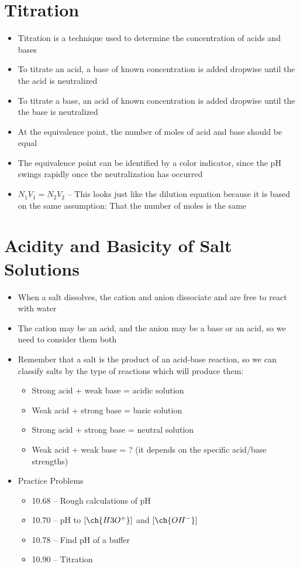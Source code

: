 \documentclass[12pt, openany, letterpaper]{memoir}
\begin{document}
\section{Titration}
\begin{itemize}
	\item Titration is a technique used to determine the concentration of acids and bases
	\item To titrate an acid, a base of known concentration is added dropwise until the the acid is neutralized
	\item To titrate a base, an acid of known concentration is added dropwise until the the base is neutralized
	\item At the equivalence point, the number of moles of acid and base should be equal
	\item The equivalence point can be identified by a color indicator, since the pH swings rapidly once the neutralization has occurred
	\item $N_1V_1=N_2V_2$ -- This looks just like the dilution equation because it is based on the same assumption: That the number of moles is the same
\end{itemize}
\section{Acidity and Basicity of Salt Solutions}
\begin{itemize}
	\item When a salt dissolves, the cation and anion dissociate and are free to react with water
	\item The cation may be an acid, and the anion may be a base or an acid, so we need to consider them both
	\item Remember that a salt is the product of an acid-base reaction, so we can classify salts by the type of reactions which will produce them:
	\begin{itemize}
		\item Strong acid + weak base = acidic solution
		\item Weak acid + strong base = basic solution
		\item Strong acid + strong base = neutral solution
		\item Weak acid + weak base = ? (it depends on the specific acid/base strengths)
	\end{itemize}
	\item Practice Problems
	\begin{itemize}
		\item 10.68 -- Rough calculations of pH
		\item 10.70 -- pH to $\left[\ch{H3O^+}\right]$ and $\left[\ch{OH^-}\right]$ 
		\item 10.78 -- Find pH of a buffer
		\item 10.90 -- Titration
	\end{itemize}
\end{itemize}
\end{document}
